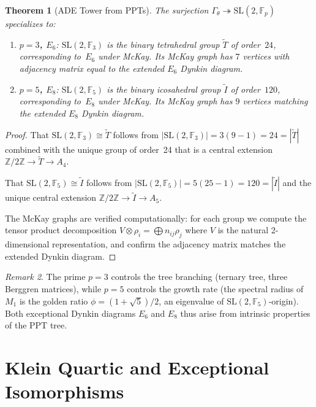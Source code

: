 \documentclass[12pt]{amsart}
\newtheorem{theorem}{Theorem}[section]
\theoremstyle{definition}
\theoremstyle{remark}
\newtheorem{remark}[theorem]{Remark}
\newcommand{\SL}{\mathrm{SL}}
\newcommand{\Fp}{\mathbb{F}_p}
\newcommand{\Z}{\mathbb{Z}}
\newcommand{\Gtheta}{\Gamma_\theta}
\begin{document}
\begin{theorem}[ADE Tower from PPTs]\label{thm:ade}
The surjection $\Gtheta \twoheadrightarrow \SL(2,\Fp)$ specializes to:
\begin{enumerate}[label=(\roman*)]
\item \textbf{$p=3$, $E_6$}: $\SL(2,\mathbb{F}_3)$ is the binary
  tetrahedral group $\widetilde{T}$ of order~$24$, corresponding to~$E_6$
  under McKay.  Its McKay graph has $7$ vertices with adjacency matrix
  equal to the extended $E_6$ Dynkin diagram.
\item \textbf{$p=5$, $E_8$}: $\SL(2,\mathbb{F}_5)$ is the binary
  icosahedral group $\widetilde{I}$ of order~$120$, corresponding to~$E_8$
  under McKay.  Its McKay graph has $9$ vertices matching the extended
  $E_8$ Dynkin diagram.
\end{enumerate}
\end{theorem}

\begin{proof}
That $\SL(2,\mathbb{F}_3) \cong \widetilde{T}$ follows from
$|\SL(2,\mathbb{F}_3)| = 3(9-1) = 24 = |\widetilde{T}|$
combined with the unique group of order~24 that is a central extension
$\Z/2\Z \to \widetilde{T} \to A_4$.

That $\SL(2,\mathbb{F}_5) \cong \widetilde{I}$ follows from
$|\SL(2,\mathbb{F}_5)| = 5(25-1) = 120 = |\widetilde{I}|$
and the unique central extension $\Z/2\Z \to \widetilde{I} \to A_5$.

The McKay graphs are verified computationally: for each group we compute
the tensor product decomposition $V \otimes \rho_i = \bigoplus n_{ij}
\rho_j$ where $V$ is the natural 2-dimensional representation, and
confirm the adjacency matrix matches the extended Dynkin diagram.
\end{proof}

\begin{remark}
The prime $p = 3$ controls the tree branching (ternary tree, three
Berggren matrices), while $p = 5$ controls the growth rate (the spectral
radius of $M_1$ is the golden ratio $\phi = (1+\sqrt{5})/2$,
an eigenvalue of $\SL(2,\mathbb{F}_5)$-origin).  Both exceptional Dynkin
diagrams $E_6$ and $E_8$ thus arise from intrinsic properties of the
PPT tree.
\end{remark}

\section{Klein Quartic and Exceptional Isomorphisms}\label{sec:klein}
\end{document}
